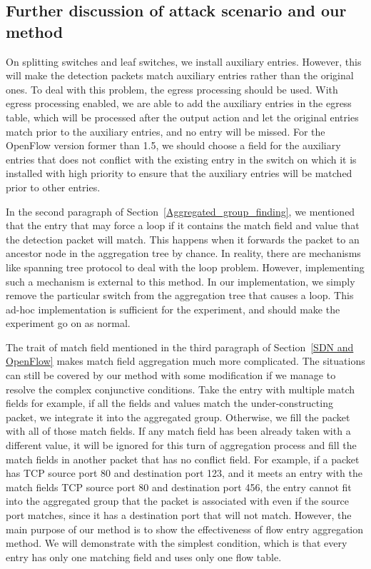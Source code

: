 \subsection{Further discussion of attack scenario and our method}
\label{Further_discussion}
On splitting switches and leaf switches, we install auxiliary entries. However, this will make the detection packets match auxiliary entries rather than the original ones. To deal with this problem, the egress processing should be used. With egress processing enabled, we are able to add the auxiliary entries in the egress table, which will be processed after the output action and let the original entries match prior to the auxiliary entries, and no entry will be missed. For the OpenFlow version former than 1.5, we should choose a field for the auxiliary entries that does not conflict with the existing entry in the switch on which it is installed with high priority to ensure that the auxiliary entries will be matched prior to other entries.

In the second paragraph of Section~\ref{Aggregated_group_finding}, we mentioned that the entry that may force a loop if it contains the match field and value that the detection packet will match. This happens when it forwards the packet to an ancestor node in the aggregation tree by chance. In reality, there are mechanisms like spanning tree protocol to deal with the loop problem. However, implementing such a mechanism is external to this method. In our implementation, we simply remove the particular switch from the aggregation tree that causes a loop. This ad-hoc implementation is sufficient for the experiment, and should make the experiment go on as normal.

The trait of match field mentioned in the third paragraph of Section~\ref{SDN and OpenFlow} makes match field aggregation much more complicated. The situations can still be covered by our method with some modification if we manage to resolve the complex conjunctive conditions. Take the entry with multiple match fields for example, if all the fields and values match the under-constructing packet, we integrate it into the aggregated group. Otherwise, we fill the packet with all of those match fields. If any match field has been already taken with a different value, it will be ignored for this turn of aggregation process and fill the match fields in another packet that has no conflict field. For example, if a packet has TCP source port 80 and destination port 123, and it meets an entry with the match fields TCP source port 80 and destination port 456, the entry cannot fit into the aggregated group that the packet is associated with even if the source port matches, since it has a destination port that will not match. However, the main purpose of our method is to show the effectiveness of flow entry aggregation method. We will demonstrate with the simplest condition, which is that every entry has only one matching field and uses only one flow table.

